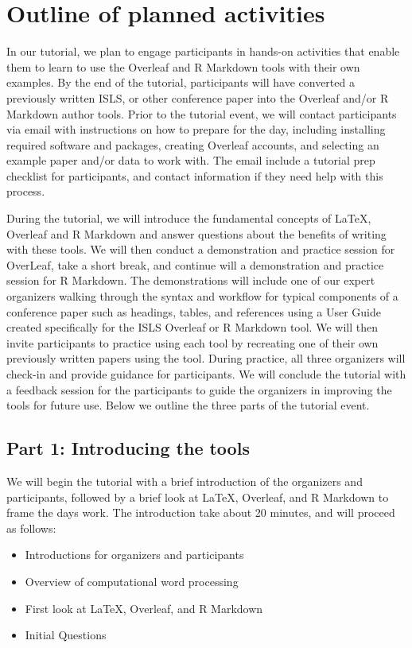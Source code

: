 \documentclass{article}
\begin{document}
\section{Outline of planned activities}
In our tutorial, we plan to engage participants in hands-on activities that enable them to learn to use the Overleaf and R Markdown tools with their own examples. By the end of the tutorial, participants will have converted a previously written ISLS, or other conference paper into the Overleaf and/or R Markdown author tools. Prior to the tutorial event, we will contact participants via email with instructions on how to prepare for the day, including installing required software and packages, creating Overleaf accounts, and selecting an example paper and/or data to work with. The email include a tutorial prep checklist for participants, and contact information if they need help with this process.

During the tutorial, we will introduce the fundamental concepts of LaTeX, Overleaf and R Markdown and answer questions about the benefits of writing with these tools. We will then conduct a demonstration and practice session for OverLeaf, take a short break, and continue will a demonstration and practice session for R Markdown. The demonstrations will include one of our expert organizers walking through the syntax and workflow for typical components of a conference paper such as headings, tables, and references using a User Guide created specifically for the ISLS Overleaf or R Markdown tool. We will then invite participants to practice using each tool by recreating one of their own previously written papers using the tool. During practice, all three organizers will check-in and provide guidance for participants. We will conclude the tutorial with a feedback session for the participants to guide the organizers in improving the tools for future use. Below we outline the three parts of the tutorial event.
\subsection{Part 1: Introducing the tools} 
We will begin the tutorial with a brief introduction of the organizers and participants, followed by a brief look at LaTeX, Overleaf, and R Markdown to frame the days work. The introduction take about 20 minutes, and will proceed as follows:
\begin{itemize}
  \item Introductions for organizers and participants
  \item Overview of computational word processing
  \item First look at LaTeX, Overleaf, and R Markdown
  \item Initial Questions
\end{itemize}
\end{document}
